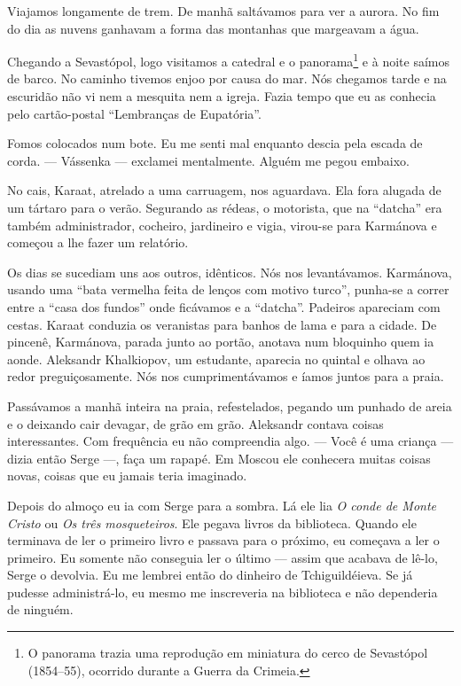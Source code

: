 Viajamos longamente de trem. De manhã saltávamos para ver a aurora. No
fim do dia as nuvens ganhavam a forma das montanhas que margeavam a
água.

Chegando a Sevastópol, logo visitamos a catedral e o panorama\footnote{O
  panorama trazia uma reprodução em miniatura do cerco de Sevastópol
  (1854--55), ocorrido durante a Guerra da Crimeia.} e à noite saímos de
barco. No caminho tivemos enjoo por causa do mar. Nós chegamos tarde e
na escuridão não vi nem a mesquita nem a igreja. Fazia tempo que eu as
conhecia pelo cartão-postal ``Lembranças de Eupatória''.

Fomos colocados num bote. Eu me senti mal enquanto descia pela escada de
corda. --- Vássenka --- exclamei mentalmente. Alguém me pegou embaixo.

No cais, Karaat, atrelado a uma carruagem, nos aguardava. Ela fora
alugada de um tártaro para o verão. Segurando as rédeas, o motorista,
que na ``datcha'' era também administrador, cocheiro, jardineiro e
vigia, virou-se para Karmánova e começou a lhe fazer um relatório.

Os dias se sucediam uns aos outros, idênticos. Nós nos levantávamos.
Karmánova, usando uma ``bata vermelha feita de lenços com motivo
turco'', punha-se a correr entre a ``casa dos fundos'' onde ficávamos e
a ``datcha''. Padeiros apareciam com cestas. Karaat conduzia os
veranistas para banhos de lama e para a cidade. De pincenê, Karmánova,
parada junto ao portão, anotava num bloquinho quem ia aonde. Aleksandr
Khalkiopov, um estudante, aparecia no quintal e olhava ao redor
preguiçosamente. Nós nos cumprimentávamos e íamos juntos para a praia.

Passávamos a manhã inteira na praia, refestelados, pegando um punhado de
areia e o deixando cair devagar, de grão em grão. Aleksandr contava
coisas interessantes. Com frequência eu não compreendia algo. --- Você é
uma criança --- dizia então Serge ---, faça um rapapé. Em Moscou ele
conhecera muitas coisas novas, coisas que eu jamais teria imaginado.

Depois do almoço eu ia com Serge para a sombra. Lá ele lia \emph{O conde
de Monte Cristo} ou \emph{Os três mosqueteiros}. Ele pegava livros da
biblioteca. Quando ele terminava de ler o primeiro livro e passava para
o próximo, eu começava a ler o primeiro. Eu somente não conseguia ler o
último --- assim que acabava de lê-lo, Serge o devolvia. Eu me lembrei
então do dinheiro de Tchiguildéieva. Se já pudesse administrá-lo, eu
mesmo me inscreveria na biblioteca e não dependeria de ninguém.

